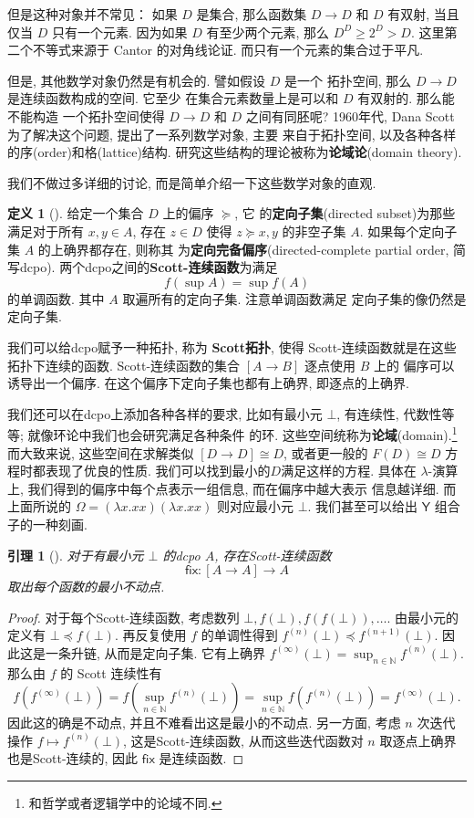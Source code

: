 \documentclass[UTF8]{ctexbook}
\newcommand{\cons}[1]{\textsf{#1}}
\theoremstyle{plain}
\newtheorem{lemma}{引理}[chapter]
\theoremstyle{definition}
\newtheorem{definition}{定义}[chapter]
\theoremstyle{remark}
\begin{document}
但是这种对象并不常见： 如果 \(D\) 是集合, 那么函数集
\(D \to D\)
和 \(D\) 有双射, 当且仅当 \(D\) 只有一个元素. 因为如果
\(D\) 有至少两个元素, 那么
\(D^D \ge 2^D > D\).
这里第二个不等式来源于 Cantor 的对角线论证.
而只有一个元素的集合过于平凡.

但是, 其他数学对象仍然是有机会的. 譬如假设 \(D\) 是一个
拓扑空间, 那么 \(D \to D\) 是连续函数构成的空间. 它至少
在集合元素数量上是可以和 \(D\) 有双射的. 那么能不能构造
一个拓扑空间使得 \(D \to D\) 和 \(D\) 之间有同胚呢?
1960年代, Dana Scott 为了解决这个问题, 提出了一系列数学对象, 主要
来自于拓扑空间, 以及各种各样的序(order)和格(lattice)结构.
研究这些结构的理论被称为\textbf{论域论}(domain theory).

我们不做过多详细的讨论, 而是简单介绍一下这些数学对象的直观.
\begin{definition}[{\cite[\S\S2.1.5--2.1.6]{abramsky:1995:domain}}]
给定一个集合 \(D\) 上的偏序 \(\succeq\), 它
的\textbf{定向子集}(directed subset)为那些满足对于所有 \(x,y\in A\),
存在 \(z \in D\) 使得 \(z \succeq x, y\) 的非空子集
\(A\). 如果每个定向子集 \(A\) 的上确界都存在, 则称其
为\textbf{定向完备偏序}(directed-complete partial order, 简写dcpo).
两个dcpo之间的\textbf{Scott-连续函数}为满足
\[f\left(\sup A\right) = \sup f(A)\]
的单调函数. 其中 \(A\) 取遍所有的定向子集. 注意单调函数满足
定向子集的像仍然是定向子集.
\end{definition}
我们可以给dcpo赋予一种拓扑, 称为 \textbf{Scott拓扑},
使得 Scott-连续函数就是在这些拓扑下连续的函数.
Scott-连续函数的集合 \([A \to B]\) 逐点使用 \(B\) 上的
偏序可以诱导出一个偏序. 在这个偏序下定向子集也都有上确界,
即逐点的上确界.

我们还可以在dcpo上添加各种各样的要求, 比如有最小元 \(\bot\),
有连续性, 代数性等等; 就像环论中我们也会研究满足各种条件
的环. 这些空间统称为\textbf{论域}(domain).\footnote{和哲学或者逻辑学中的论域不同.}
而大致来说, 这些空间在求解类似 \([D \to D] \cong D\),
或者更一般的 \(F(D) \cong D\) 方程时都表现了优良的性质.
我们可以找到最小的\(D\)满足这样的方程. 具体在 \(\lambda\)-演算
上, 我们得到的偏序中每个点表示一组信息, 而在偏序中越大表示
信息越详细. 而上面所说的 \(\Omega = (\lambda x. xx) (\lambda x.xx)\)
则对应最小元 \(\bot\). 我们甚至可以给出 \(\cons{Y}\)
组合子的一种刻画.
\begin{lemma}[{\cite[定理2.1.19]{abramsky:1995:domain}}]
对于有最小元 \(\bot\) 的dcpo \(A\),
存在Scott-连续函数 \[\cons{fix} : [A \to A] \to A\]
取出每个函数的最小不动点.
\end{lemma}
\begin{proof}
对于每个Scott-连续函数,
考虑数列 \(\bot, f(\bot), f(f(\bot)),\dots\).
由最小元的定义有 \(\bot \preceq f(\bot)\). 再反复使用
\(f\) 的单调性得到 \(f^{(n)}(\bot) \preceq f^{(n+1)}(\bot)\).
因此这是一条升链, 从而是定向子集. 它有上确界
\(f^{(\infty)}(\bot) = \sup_{n\in\mathbb N}f^{(n)}(\bot).\)
那么由 \(f\) 的 Scott 连续性有
\[f(f^{(\infty)}(\bot)) = f(\sup_{n\in\mathbb N}f^{(n)}(\bot))
= \sup_{n\in\mathbb N} f(f^{(n)}(\bot)) = f^{(\infty)}(\bot).\]
因此这的确是不动点, 并且不难看出这是最小的不动点.
另一方面, 考虑 \(n\) 次迭代操作 \(f \mapsto f^{(n)}(\bot)\),
这是Scott-连续函数, 从而这些迭代函数对 \(n\) 取逐点上确界
也是Scott-连续的, 因此 \(\cons{fix}\) 是连续函数.
\end{proof}
\end{document}
